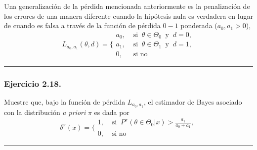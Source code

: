 \documentclass[12pt,]{article}
\begin{document}
Una generalización de la pérdida mencionada anteriormente es la
penalización de los errores de una manera diferente cuando la hipótesis
nula es verdadera en lugar de cuando es falsa a través de la función de
pérdida \(0-1\) ponderada (\(a_0,a_1>0\)), \[
L_{a_0,a_1}(\theta,d)= \Bigg \{
\begin{array}{ll}
a_0, &\text{ si }\ \theta\in\Theta_0\ \text{ y }\ d=0,\\
a_1, &\text{ si }\ \theta\in\Theta_1\ \text{ y }\ d=1,\\
0,&\text{ si no }
\end{array}
\]

\begin{center}\rule{0.5\linewidth}{\linethickness}\end{center}

\subsubsection{Ejercicio 2.18.}\label{ejercicio-2.18.}

Muestre que, bajo la función de pérdida \(L_{a_0,a_1}\), el estimador de
Bayes asociado con la distribución \emph{a priori} \(\pi\) es dada por
\[
\delta^\pi(x)=\Bigg\{
\begin{array}{ll}
1, &\text{ si }\ P^\pi(\theta\in\Theta_0|x)>\displaystyle \frac{a_1}{a_0+a_1},\\
0,&\text{ si no }
\end{array}
\]

\begin{center}\rule{0.5\linewidth}{\linethickness}\end{center}
\end{document}
